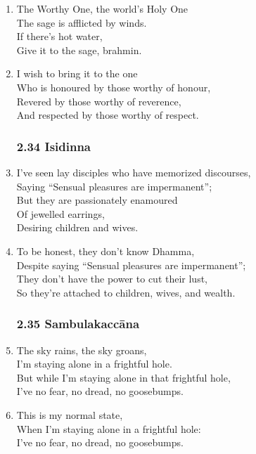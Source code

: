 \documentclass[10pt, openany]{book}
\begin{document}
\begin{enumerate}
\item The Worthy One, the world’s Holy One\\
The sage is afflicted by winds.\\
If there’s hot water,\\
Give it to the sage, brahmin.

\item I wish to bring it to the one\\
Who is honoured by those worthy of honour,\\
Revered by those worthy of reverence,\\
And respected by those worthy of respect.

\subsubsection*{2.34 Isidinna}

\item I’ve seen lay disciples who have memorized discourses,\\
Saying “Sensual pleasures are impermanent”;\\
But they are passionately enamoured \\
Of jewelled earrings,\\
Desiring children and wives.

\item To be honest, they don’t know Dhamma,\\
Despite saying “Sensual pleasures are impermanent”;\\
They don’t have the power to cut their lust,\\
So they’re attached to children, wives, and wealth.

\subsubsection*{2.35 Sambulakaccāna}

\item The sky rains, the sky groans,\\
I’m staying alone in a frightful hole.\\
But while I’m staying alone in that frightful hole,\\
I’ve no fear, no dread, no goosebumps.

\item This is my normal state,\\
When I’m staying alone in a frightful hole:\\
I’ve no fear, no dread, no goosebumps.


\end{enumerate}
\end{document}
